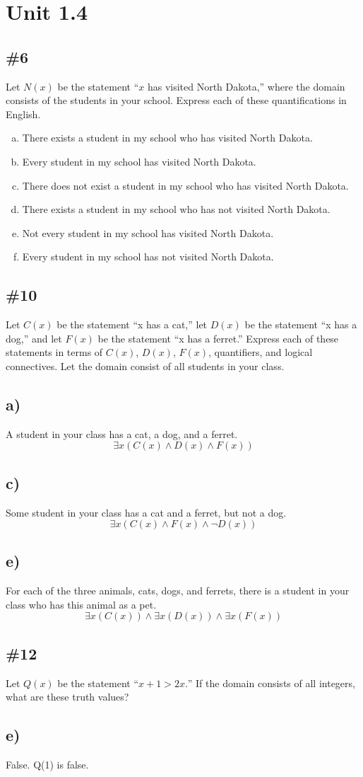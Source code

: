 \documentclass{article}
\newcommand{\unit}[1]{\section{Unit #1}}
\newcommand{\problem}[1]{\subsection{\##1}}
\renewcommand{\And}{\wedge}
\begin{document}
\pagebreak
\unit{1.4}
\problem{6}
Let \(N(x)\) be the statement “\(x\) has visited North Dakota,”
where the domain consists of the students in your school.
Express each of these quantifications in English.
\begin{enumerate}[a)]
    \item There exists a student in my school who has visited North Dakota.
    \item Every student in my school has visited North Dakota.
    \item There does not exist a student in my school who has visited North Dakota.
    \item There exists a student in my school who has not visited North Dakota.
    \item Not every student in my school has visited North Dakota.
    \item Every student in my school has not visited North Dakota.
\end{enumerate}
\pagebreak
\problem{10}
Let \(C(x)\) be the statement “x has a cat,” let \(D(x)\) be the statement “x has a dog,” and let \(F(x)\) be the statement “x has a ferret.” Express each of these statements in terms of \(C(x)\), \(D(x)\), \(F(x)\), quantifiers, and logical connectives.
Let the domain consist of all students in your class.
\subsection{a)}
A student in your class has a cat, a dog, and a ferret.
\[
    \exists x(C(x) \And D(x) \And F(x))
\]
\subsection{c)}
Some student in your class has a cat and a ferret, but not a dog.
\[
    \exists x(C(x) \And F(x) \And \neg D(x))
\]
\subsection{e)}
For each of the three animals, cats, dogs, and ferrets, there is a student in your class who has this animal as a pet.
\[
    \exists x(C(x)) \And \exists x(D(x)) \And \exists x(F(x))
\]
\pagebreak
\problem{12}
Let \(Q(x)\) be the statement “\(x + 1 > 2x.\)” If the domain consists of all integers, what are these truth values?
\subsection{e)}
False. Q(1) is false.
\end{document}
